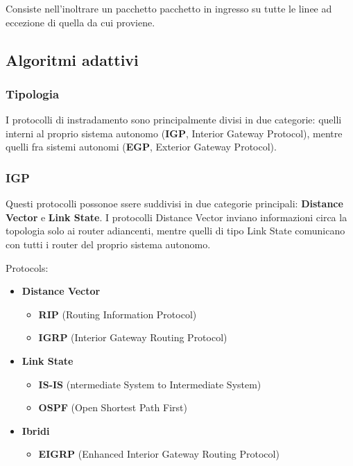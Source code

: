 \documentclass{article}
\begin{document}
Consiste nell'inoltrare un pacchetto pacchetto in ingresso su
tutte le linee ad eccezione di quella da cui proviene.

\subsection{Algoritmi adattivi}

\subsubsection{Tipologia}

I protocolli di instradamento sono principalmente
divisi in due categorie: quelli interni al proprio
sistema autonomo (\textbf{IGP}, Interior Gateway Protocol),
mentre quelli fra sistemi autonomi (\textbf{EGP}, Exterior Gateway Protocol).

\subsubsection{IGP}

Questi protocolli possonoe ssere suddivisi in due categorie principali:
\textbf{Distance Vector} e \textbf{Link State}.
I protocolli Distance Vector inviano informazioni circa la topologia solo ai router adiancenti,
mentre quelli di tipo Link State comunicano con tutti i router del proprio sistema autonomo.

\pagebreak

Protocols:

\begin{itemize}
    \item \textbf{Distance Vector}
    \begin{itemize}
        \item \textbf{RIP} (Routing Information Protocol)
        \item \textbf{IGRP} (Interior Gateway Routing Protocol)
    \end{itemize}

    \item \textbf{Link State}
    \begin{itemize}
        \item \textbf{IS-IS} (ntermediate System to Intermediate System)
        \item \textbf{OSPF} (Open Shortest Path First)
    \end{itemize}

    \item \textbf{Ibridi}
    \begin{itemize}
        \item \textbf{EIGRP} (Enhanced Interior Gateway Routing Protocol)
    \end{itemize}
\end{itemize}
\end{document}
